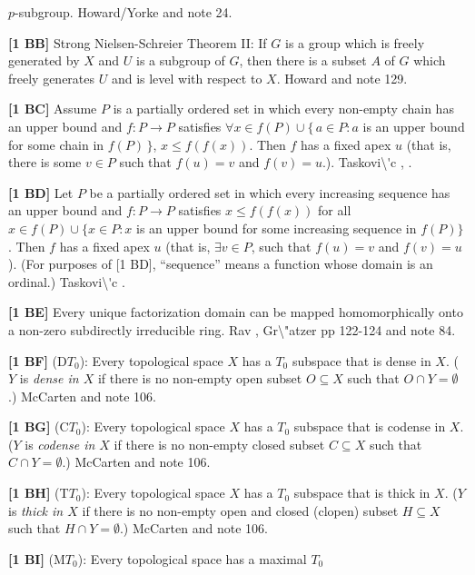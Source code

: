 $p$-subgroup.  \ac{Howard/Yorke} \cite{1987} and note 24.
\smallskip
\item{}{\bf [1 BB]} Strong Nielsen-Schreier Theorem II: If $G$ is
a group which is freely generated by $X$ and $U$ is a subgroup of $G$,
then there is a subset $A$ of $G$ which freely generates $U$ and is
level with respect to $X$.  \ac{Howard} \cite{1985} and note 129.
\smallskip
\item{}{\bf [1 BC]} Assume $P$ is a partially ordered set in which every
non-empty chain has an upper bound and $f: P\to P$ satisfies $\forall x\in
f(P) \cup \{\,a\in P : a$ is an upper bound for some chain in $f(P)\,\}$,
$x\le f(f(x))$.  Then $f$ has a fixed apex $u$ (that is, there is some $v
\in P$ such that $f(u)=v$ and $f(v)=u$.).  \ac{Taskovi\'c} \cite{1988},
\cite{1992a}.
\smallskip
\item{}{\bf [1 BD]} Let $P$ be a partially ordered set in which every
increasing sequence has an upper bound and $f:P\to P$ satisfies $x\le
f(f(x))$ for all $x\in f(P) \cup \{x\in P : x$ is an upper bound
for some increasing sequence in $f(P)\}$. Then $f$ has a fixed apex $u$
(that is, $\exists v\in P$, such that $f(u) = v$ and $f(v) = u$).
(For purposes of [1 BD], ``sequence'' means a function whose domain is
an ordinal.)  \ac{Taskovi\'c} \cite{1992b}.
\smallskip
\item{}{\bf [1 BE]} Every unique factorization domain can be mapped
homomorphically onto a non-zero subdirectly irreducible ring.
\ac{Rav} \cite{1988},  \ac{Gr\"atzer} \cite{1979} pp 122-124 and note 84.
\smallskip
\item{}{\bf [1 BF]} (D$T_0$): Every topological space $X$ has a $T_0$
subspace that is dense in $X$. ($Y$ is {\it dense in $X$} if there is no
non-empty open subset $O\subseteq X$ such that $O\cap Y=\emptyset$.)
\ac{McCarten} \cite{1988} and note 106.
\smallskip
\item{}{\bf [1 BG]} (C$T_0$): Every topological space $X$ has a $T_0$
subspace that is codense in $X$. ($Y$ is {\it codense in $X$} if there is no
non-empty closed subset $C\subseteq X$ such that $C\cap Y=\emptyset$.)
\ac{McCarten} \cite{1988} and note 106.
\smallskip
\item{}{\bf [1 BH]} (T$T_0$): Every topological space $X$ has a $T_0$
subspace that is thick in $X$. ($Y$ is {\it thick in $X$} if there is no
non-empty open and closed (clopen) subset $H\subseteq X$ such that
$H\cap Y=\emptyset$.) \ac{McCarten} \cite{1988} and note 106.
\smallskip
\item{}{\bf [1 BI]} (M$T_0$): Every topological space has a maximal $T_0$
